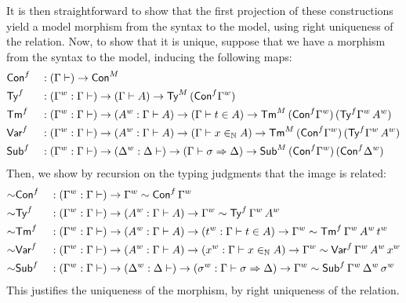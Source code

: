 It is then straightforward to show that the first projection of these
constructions yield a model morphism from the syntax to the model, using right
uniqueness of the relation.
Now, to show that it is unique, suppose that we have a morphism from the
syntax to the model, inducing the following maps:
\begin{alignat*}{5}
  &
  {\mathsf{Con}}^f
  && :
   (\Gamma \vdash) \rightarrow {\mathsf{Con}}^M
   \\
  &
  {\mathsf{Ty}}^f
  && :
   ({\Gamma}^w:\Gamma \vdash) \rightarrow (\Gamma\vdash A)\rightarrow{\mathsf{Ty}}^M\,({\mathsf{Con}}^f{\Gamma}^w)
   \\
  &
  {\mathsf{Tm}}^f
  && :
  ({\Gamma}^w:\Gamma \vdash) \rightarrow ({A}^w:\Gamma\vdash A)\rightarrow
  (\Gamma\vdash t \in A)\rightarrow{\mathsf{Tm}}^M\,({\mathsf{Con}}^f{\Gamma}^w)\,
  ({\mathsf{Ty}}^f{\Gamma}^w\,{A}^w)
   \\
  &
  {\mathsf{Var}}^f
  && :
  ({\Gamma}^w:\Gamma \vdash) \rightarrow ({A}^w:\Gamma\vdash A)\rightarrow
  (\Gamma\vdash x \in_{\mathbb{N}} A)\rightarrow{\mathsf{Tm}}^M\,({\mathsf{Con}}^f{\Gamma}^w)\,
  ({\mathsf{Ty}}^f{\Gamma}^w\,{A}^w)
   \\
  &
  {\mathsf{Sub}}^f
  && :
  ({\Gamma}^w:\Gamma \vdash) \rightarrow
  ({\Delta}^w:\Delta \vdash) \rightarrow
  (\Gamma\vdash \sigma \Rightarrow \Delta)\rightarrow{\mathsf{Sub}}^M\,({\mathsf{Con}}^f{\Gamma}^w)\,
  ({\mathsf{Con}}^f{\Delta}^w)
\end{alignat*}
Then, we show by recursion on the typing judgments that
the image is related:
\begin{alignat*}{5}
  &
  {\sim}{\mathsf{Con}}^f
  && :
  ({\Gamma}^w : \Gamma \vdash) \rightarrow {\Gamma}^w\sim {\mathsf{Con}}^f\,{\Gamma}^w
  \\
  &
  {\sim}{\mathsf{Ty}}^f
  && :
  ({\Gamma}^w : \Gamma \vdash) \rightarrow
  ({A}^w : \Gamma \vdash A) \rightarrow
  {\Gamma}^w\sim {\mathsf{Ty}}^f\,{\Gamma}^w\,{A}^w
  \\
  &
  {\sim}{\mathsf{Tm}}^f
  && :
  ({\Gamma}^w : \Gamma \vdash) \rightarrow
  ({A}^w : \Gamma \vdash A) \rightarrow
  ({t}^w : \Gamma \vdash t \in A) \rightarrow
  {\Gamma}^w\sim {\mathsf{Tm}}^f\,{\Gamma}^w\,{A}^w\,{t}^w
  \\
  &
  {\sim}{\mathsf{Var}}^f
  && :
  ({\Gamma}^w : \Gamma \vdash) \rightarrow
  ({A}^w : \Gamma \vdash A) \rightarrow
  ({x}^w : \Gamma \vdash x \in_{\mathbb{N}} A) \rightarrow
  {\Gamma}^w\sim {\mathsf{Var}}^f\,{\Gamma}^w\,{A}^w\,{x}^w
  \\
  &
  {\sim}{\mathsf{Sub}}^f
  && :
  ({\Gamma}^w : \Gamma \vdash) \rightarrow
  ({\Delta}^w : \Delta \vdash) \rightarrow
  ({\sigma}^w : \Gamma \vdash \sigma \Rightarrow \Delta) \rightarrow
  {\Gamma}^w\sim {\mathsf{Sub}}^f\,{\Gamma}^w\,{\Delta}^w\,{\sigma}^w
\end{alignat*}
This justifies the uniqueness of the morphism, by right uniqueness of the relation.


